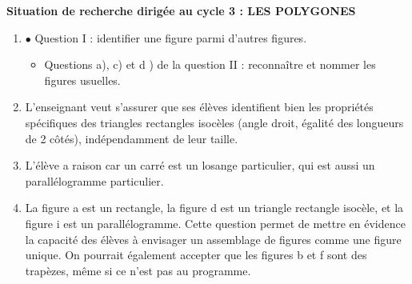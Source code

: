 \begin{corrige}
\medskip
{\bf Situation de recherche dirigée au cycle 3 : LES POLYGONES} \\
\begin{enumerate}
   \item \textcolor{A2}{$\bullet$} Question I : identifier une figure parmi d'autres figures.       
   \begin{itemize} 
      \item Questions a), c) et d ) de la question II : reconnaître et nommer les figures usuelles.
   \end{itemize}
   \item L'enseignant veut s'assurer que ses élèves identifient bien les propriétés spécifiques des triangles rectangles isocèles (angle droit, égalité des longueurs de 2 côtés), indépendamment de leur taille.
   \item L'élève a raison car un carré est un losange particulier, qui est aussi un parallélogramme particulier.
   \item La figure a est un rectangle, la figure d est un triangle rectangle isocèle, et la figure i est un parallélogramme. Cette question permet de mettre en évidence la capacité des élèves à envisager un assemblage de figures comme une figure unique. On pourrait également accepter que les figures b et f sont des trapèzes, même si ce n'est pas au programme.
\end{enumerate}
\end{corrige}
   
\bigskip


